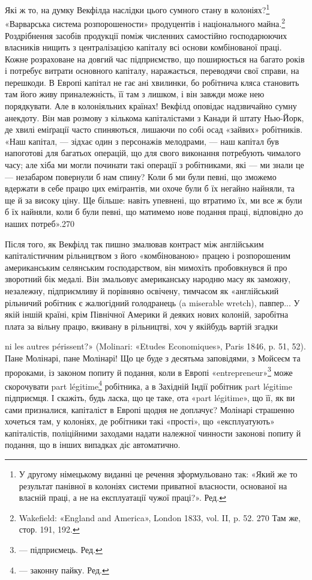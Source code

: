 Які ж то, на думку Векфілда наслідки цього сумного стану в колоніях?\footnote*{
У другому німецькому виданні це речення зформульовано так: «Який же то результат панівної в
колоніях системи приватної власности, основаної на власній праці, а не на експлуатації чужої
праці?». Ред.
} «Варварська система
розпорошености» продуцентів і національного майна.\footnote{
Wakefield: «England and America», London 1833, vol. II, p. 52.
270 Там же, стор. 191, 192.
} Роздрібнення засобів
продукції поміж численних самостійно господарюючих власників нищить з централізацією капіталу всі
основи комбінованої праці. Кожне розраховане на довгий час підприємство, що поширюється на багато
років і потребує витрати основного капіталу, наражається, переводячи свої справи, на перешкоди. В
Европі капітал не гає ані хвилинки, бо робітнича кляса становить там його живу приналежність, її там
з лишком, і він завжди може нею порядкувати. Але в колоніяльних країнах! Векфілд
оповідає надзвичайно сумну анекдоту. Він мав розмову з кількома капіталістами з Канади й штату
Нью-Йорк, де хвилі еміґрації часто спиняються, лишаючи по собі осад «зайвих» робітників. «Наш
капітал, — зідхає один з персонажів мелодрами, — наш капітал був напоготові для багатьох операцій,
що для свого виконання потребують чималого часу; але хіба ми могли починати такі операції з
робітниками, які — ми знали це — незабаром повернули б нам спину? Коли б ми були певні, що зможемо
вдержати в себе працю цих еміґрантів, ми охоче були б їх негайно найняли, та ще й за високу ціну. Ще
більше: навіть упевнені, що втратимо їх, ми все ж були б їх найняли, коли б були певні, що матимемо
нове подання праці, відповідно до наших потреб».270

Після того, як Векфілд так пишно змалював контраст між англійським капіталістичним рільництвом з
його «комбінованою» працею і розпорошеним американським селянським господарством, він мимохіть
пробовкнувся й про зворотний бік
медалі. Він змальовує американську народню масу як заможну, незалежну, підприємливу й порівняно
освічену, тимчасом як «англійський рільничий робітник є жалюгідний голодранець (a miserable wretch),
павпер... У якій іншій країні, крім Північної Америки й деяких нових колоній, заробітна плата за
вільну працю, вживану в рільництві, хоч у якійбудь вартій згадки

ni les autres périssent?» (Molinari: «Etudes Economiques», Paris 1846, p. 51, 52). Пане Молінарі,
пане Молінарі! Що це буде з десятьма заповідями, з Мойсеєм та пророками, із законом попиту й
подання, коли в Европі «entrepreneur»\footnote*{
— підприємець. Ред.
} може скорочувати part légitime\footnote*{
— законну пайку. Ред.
} робітника, а в Західній
Індії робітник part légitime підприємця. І скажіть, будь ласка, що це таке, ота «part légitime», що
її, як ви сами призналися, капіталіст
в Европі щодня не доплачує? Молінарі страшенно хочеться там, у колоніях, де робітники такі «прості»,
що «експлуатують» капіталістів, поліційними заходами надати належної чинности законові попиту й
подання, що в інших випадках діє автоматично.
\parbreak{}  %
